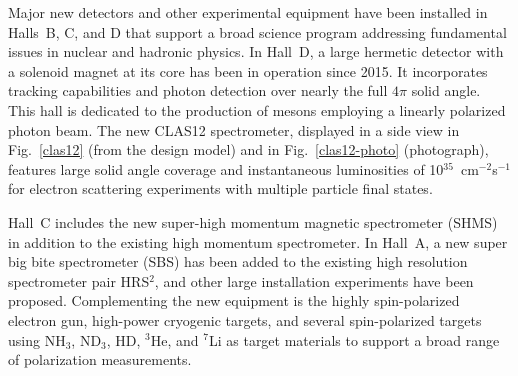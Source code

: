 \documentclass[final,3p,twocolumn]{elsarticle}
\begin{document}
Major new detectors and other experimental equipment have been installed in Halls~B, C, and D that support a broad
science program addressing fundamental issues in nuclear and hadronic physics. In Hall~D, a large hermetic detector
with a solenoid magnet at its core has been in operation since 2015. It incorporates tracking capabilities and photon
detection over nearly the full $4\pi$ solid angle. This hall is dedicated to the production of mesons employing a linearly
polarized photon beam. The new CLAS12 spectrometer, displayed in a side view in Fig.~\ref{clas12} (from the design
model) and in Fig.~\ref{clas12-photo} (photograph), features large solid angle coverage and instantaneous luminosities
of 10$^{35}$~cm$^{-2}$s$^{-1}$ for electron scattering experiments with multiple particle final states. 

Hall~C includes the new super-high momentum magnetic spectrometer (SHMS) in addition to the existing high
momentum spectrometer. In Hall~A, a new super big bite spectrometer (SBS) has been added to the
existing high resolution spectrometer pair HRS$^2$, and other large installation experiments have been proposed.
Complementing the new equipment is the highly spin-polarized electron gun, high-power cryogenic targets, and
several spin-polarized targets using NH$_3$, ND$_3$, HD, $^3$He, and $^7$Li as target materials to support a
broad range of polarization measurements.   
\end{document}
